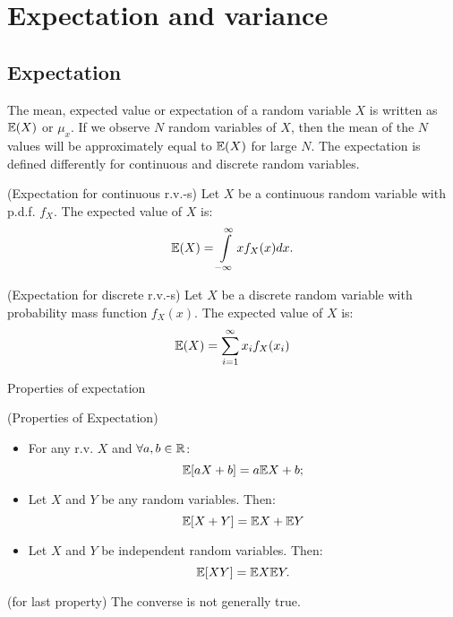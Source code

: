 \section{Expectation and variance}

\subsection*{Expectation}
\par 
The mean, expected value or expectation of a random variable $X$ is written as $\mathbb{E}(X)$ or $\mu_x$. If we observe $N$ random variables of $X$, then the mean of the $N$ values will be approximately equal to $\mathbb{E}(X)$ for large $N$. The expectation is defined differently for continuous and discrete random variables.

\begin{definition}{(Expectation for continuous r.v.-s)}{}
    Let $X$ be a continuous random variable with p.d.f. $f_X$. The expected value of $X$ is:
    \[
        \mathbb{E} (X) = \int\limits_{-\infty}^{\infty} xf_X(x) dx . 
    \]
\end{definition}

\begin{definition}{(Expectation for discrete r.v.-s)}{}
    Let $X$ be a discrete random variable with probability mass function $f_X(x)$. The expected value of $X$ is:
    \[
        \mathbb{E}(X) = \sum\limits_{i=1}^\infty x_if_X(x_i) 
    \]
\end{definition}
Properties of expectation
\begin{theorema}{(Properties of Expectation)}{}
    \begin{itemize}
        \item For any r.v. $X$ and $\forall a, b \in \mathbb{R}$:
        \useshortskip
        \[
            \mathbb{E}[aX + b] = a\mathbb{E} X + b;
        \]
        \item Let $X$ and $Y$ be any random variables. Then:
        \[
            \mathbb{E}[X+Y] = \mathbb{E} X + \mathbb{E} Y            
        \]
        \item Let $X$ and $Y$ be independent random variables. Then:
        \[
            \mathbb{E}[XY] = \mathbb{E} X \mathbb{E} Y.  
        \]
    \end{itemize}
\end{theorema}

\begin{note}{}{}
    (for last property) The converse is not generally true.
\end{note}

